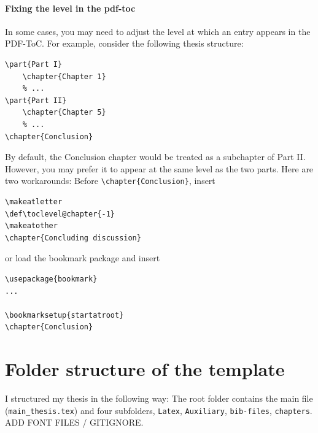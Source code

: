 \paragraph{Fixing the level in the pdf-toc}
In some cases, you may need to adjust the level at which an entry appears in the PDF-ToC. For example, consider the following thesis structure:
\begin{lstlisting}
\part{Part I}
	\chapter{Chapter 1}
	% ... 
\part{Part II}
	\chapter{Chapter 5}
	% ...
\chapter{Conclusion}
\end{lstlisting}
By default, the Conclusion chapter would be treated as a subchapter of Part II. However, you may prefer it to appear at the same level as the two parts. Here are two workarounds:
Before \verb|\chapter{Conclusion}|, insert
\begin{lstlisting}
\makeatletter
\def\toclevel@chapter{-1}
\makeatother
\chapter{Concluding discussion}
\end{lstlisting}
or load the bookmark package and insert
\begin{lstlisting}
\usepackage{bookmark}
...

\bookmarksetup{startatroot}
\chapter{Conclusion}
\end{lstlisting}


\section{Folder structure of the template}
I structured my thesis in the following way: The root folder contains the main file (\verb|main_thesis.tex|) and four subfolders, \verb|Latex|, \verb|Auxiliary|, \verb|bib-files|, \verb|chapters|. ADD FONT FILES / GITIGNORE.
